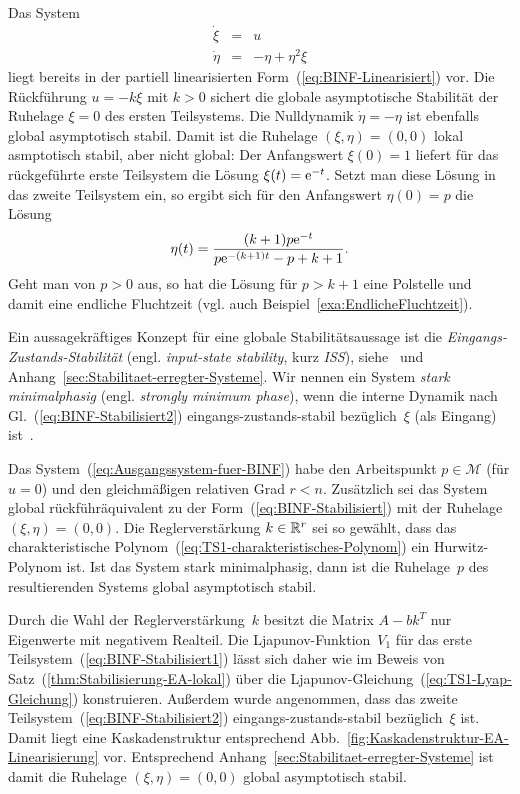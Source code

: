 \begin{example}
\label{exa:keine-globale-stabiliserung-mit-linearer-rueckf}Das System
\[
\begin{array}{lcl}
\dot{\xi} & = & u\\
\dot{\eta} & = & -\eta+\eta^{2}\xi
\end{array}
\]
liegt bereits in der partiell linearisierten Form~(\ref{eq:BINF-Linearisiert})
vor. Die Rückführung $u=-k\xi$ mit $k>0$ sichert die globale asymptotische
Stabilität der Ruhelage $\xi=0$ des ersten Teilsystems. Die Nulldynamik
$\dot{\eta}=-\eta$ ist ebenfalls global asymptotisch stabil. Damit
ist die Ruhelage $(\xi,\eta)=(0,0)$ lokal asmptotisch stabil, aber
nicht global: Der Anfangswert $\xi(0)=1$ liefert für das rückgeführte
erste Teilsystem die Lösung $\xi(t)={\mathrm{e}}^{-t}$. Setzt man diese Lösung
in das zweite Teilsystem ein, so ergibt sich für den Anfangswert $\eta(0)=p$
die Lösung
\[
\eta(t)=\frac{(k+1)p{\mathrm{e}}^{-t}}{p{\mathrm{e}}^{-(k+1)t}-p+k+1}.
\]
Geht man von $p>0$ aus, so hat die Lösung für $p>k+1$ eine Polstelle
und damit eine endliche Fluchtzeit (vgl. auch Beispiel~\ref{exa:EndlicheFluchtzeit}).

Ein aussagekräftiges Konzept für eine globale Stabilitätsaussage ist
die \emph{Eingangs-Zustands-Stabilität} (engl. \emph{input-state stability},
kurz \emph{ISS}), siehe~\cite{sontag1995ejc,sontag2000} und Anhang~\ref{sec:Stabilitaet-erregter-Systeme}.
Wir nennen ein System \emph{stark minimalphasig}
(engl. \emph{strongly minimum phase}), wenn die interne Dynamik nach
Gl.~(\ref{eq:BINF-Stabilisiert2}) eingangs-zustands-stabil
bezüglich~$\xi$ (als Eingang) ist~\cite{liberzon2000,isidori2013ejc}.
\end{example}
\begin{theorem}
\label{thm:Stabilisierung-EA-global}Das System~(\ref{eq:Ausgangssystem-fuer-BINF})
habe den Arbeitspunkt $p\in\mathcal{M}$ (für $u=0$) und den gleichmäßigen
relativen Grad $r<n$. Zusätzlich sei das System global rück\-führ\-äquivalent
zu der Form~(\ref{eq:BINF-Stabilisiert}) mit der Ruhelage $(\xi,\eta)=(0,0)$.
Die Reglerverstärkung $k\in{\mathbb{R}}^{r}$ sei so gewählt, dass das charakteristische
Polynom~(\ref{eq:TS1-charakteristisches-Polynom}) ein Hurwitz-Polynom
ist. Ist das System stark minimalphasig, dann ist die Ruhelage~$p$
des resultierenden Systems global asymptotisch stabil.
\end{theorem}
\begin{svmultproof2}
Durch die Wahl der Reglerverstärkung~$k$ besitzt die Matrix $A-bk^{T}$
nur Eigenwerte mit negativem Realteil. Die Ljapunov-Funktion~$V_{1}$
für das erste Teil\-system~(\ref{eq:BINF-Stabilisiert1}) lässt
sich daher wie im Beweis von Satz~(\ref{thm:Stabilisierung-EA-lokal})
über die Ljapunov-Gleichung~(\ref{eq:TS1-Lyap-Gleichung}) konstruieren.
Außerdem wurde angenommen, dass das zweite Teilsystem~(\ref{eq:BINF-Stabilisiert2})
eingangs-zustands-stabil bezüglich~$\xi$ ist. Damit liegt eine Kaskadenstruktur
entsprechend Abb.~\ref{fig:Kaskadenstruktur-EA-Linearisierung} vor.
Entsprechend Anhang~\ref{sec:Stabilitaet-erregter-Systeme} ist damit
die Ruhelage $(\xi,\eta)=(0,0)$ global asymptotisch stabil.
\end{svmultproof2}

